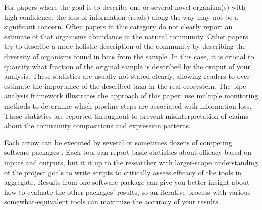 For papers where the goal is to describe one or several novel organism(s) with high confidence, the loss of information (reads) along the way may not be a significant concern.
Often papers in this category do not clearly report an estimate of that organisms abundance in the natural community.
Other papers try to describe a more holistic description of the community \cite{kantor2017} by describing the diversity of organisms found in bins from the sample.
In this case, it is crucial to quantify what fraction of the original sample is described by the output of your analysis.
These statistics are usually not stated clearly, allowing readers to over-estimate the importance of the described taxa in the real ecosystem.
The pipe analysis framework illustrates the approach of this paper: use multiple monitoring methods to determine which pipeline steps are associated with information loss.
These statistics are reported throughout to prevent misinterpretation of claims about the community compositions and expression patterns.

Each arrow can be executed by several or sometimes dozens of competing software packages \cite{sangwan2016,thomas2012}.
Each tool can report basic statistics about efficacy based on inputs and outputs, but it it up to the researcher with larger-scope understanding of the project goals to write scripts to critically assess efficacy of the tools in aggregate.
Results from one software package can give you better insight about how to evaluate the other packages' results, so an iterative process with various somewhat-equivalent tools can maximize the accuracy of your results.

